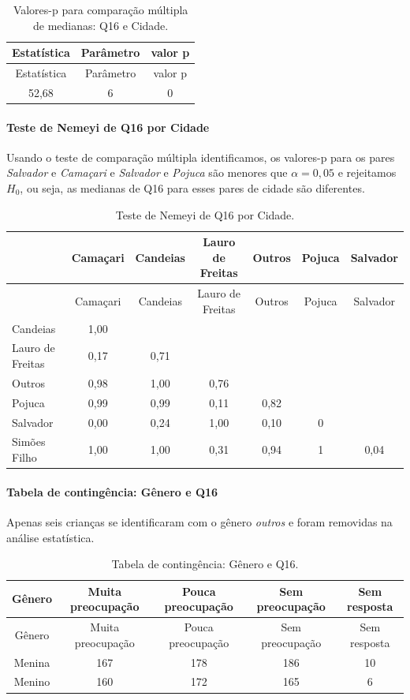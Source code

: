\documentclass[]{article}
\let\oldparagraph\paragraph
\renewcommand{\paragraph}[1]{\oldparagraph{#1}\mbox{}}
\begin{document}
\begin{longtable}[]{@{}ccc@{}}
\caption{\label{tab:unnamed-chunk-141}Valores-p para comparação múltipla de medianas: Q16 e Cidade.}\tabularnewline
\toprule
Estatística & Parâmetro & valor p\tabularnewline
\midrule
\endfirsthead
\toprule
Estatística & Parâmetro & valor p\tabularnewline
\midrule
\endhead
52,68 & 6 & 0\tabularnewline
\bottomrule
\end{longtable}

\hypertarget{teste-de-nemeyi-de-q16-por-cidade}{%
\paragraph{Teste de Nemeyi de Q16 por Cidade}\label{teste-de-nemeyi-de-q16-por-cidade}}

Usando o teste de comparação múltipla identificamos, os valores-p para os pares \emph{Salvador} e \emph{Camaçari} e \emph{Salvador} e \emph{Pojuca} são menores que \(\alpha=0,05\) e rejeitamos \(H_0\), ou seja, as medianas de Q16 para esses pares de cidade são diferentes.

\begin{longtable}[]{@{}lcccccc@{}}
\caption{\label{tab:unnamed-chunk-142}Teste de Nemeyi de Q16 por Cidade.}\tabularnewline
\toprule
& Camaçari & Candeias & Lauro de Freitas & Outros & Pojuca & Salvador\tabularnewline
\midrule
\endfirsthead
\toprule
& Camaçari & Candeias & Lauro de Freitas & Outros & Pojuca & Salvador\tabularnewline
\midrule
\endhead
Candeias & 1,00 & & & & &\tabularnewline
Lauro de Freitas & 0,17 & 0,71 & & & &\tabularnewline
Outros & 0,98 & 1,00 & 0,76 & & &\tabularnewline
Pojuca & 0,99 & 0,99 & 0,11 & 0,82 & &\tabularnewline
Salvador & 0,00 & 0,24 & 1,00 & 0,10 & 0 &\tabularnewline
Simões Filho & 1,00 & 1,00 & 0,31 & 0,94 & 1 & 0,04\tabularnewline
\bottomrule
\end{longtable}

\cleardoublepage

\hypertarget{tabela-de-continguxeancia-guxeanero-e-q16}{%
\paragraph{Tabela de contingência: Gênero e Q16}\label{tabela-de-continguxeancia-guxeanero-e-q16}}

Apenas seis crianças se identificaram com o gênero \emph{outros} e foram removidas na análise estatística.

\begin{longtable}[]{@{}ccccc@{}}
\caption{\label{tab:unnamed-chunk-143}Tabela de contingência: Gênero e Q16.}\tabularnewline
\toprule
Gênero & Muita preocupação & Pouca preocupação & Sem preocupação & Sem resposta\tabularnewline
\midrule
\endfirsthead
\toprule
Gênero & Muita preocupação & Pouca preocupação & Sem preocupação & Sem resposta\tabularnewline
\midrule
\endhead
Menina & 167 & 178 & 186 & 10\tabularnewline
Menino & 160 & 172 & 165 & 6\tabularnewline
\bottomrule
\end{longtable}
\end{document}
